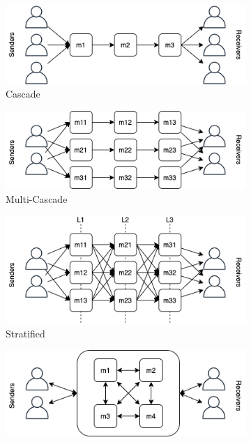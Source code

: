 \documentclass[logo,msc,cyber]{infthesis}   %
\begin{document}
\begin{figure}[h!]
    \centering
    \begin{subfigure}[b]{0.45\textwidth}
        \centering
        \includegraphics[width=\textwidth]{figures/topologies/cascade.png}
        \caption{Cascade}
        \label{fig:cascade}
    \end{subfigure}
    \hfill
    \begin{subfigure}[b]{0.45\textwidth}
        \centering
        \includegraphics[width=\textwidth]{figures/topologies/multi-cascade.png}
        \caption{Multi-Cascade}
        \label{fig:multi-cascade}
    \end{subfigure}
    \hfill
    \begin{subfigure}[b]{0.45\textwidth}
        \centering
        \includegraphics[width=\textwidth]{figures/topologies/stratified.png}
        \caption{Stratified}
        \label{fig:stratified}
    \end{subfigure}
    \hfill
    \begin{subfigure}[b]{0.45\textwidth}
        \centering
        \includegraphics[width=\textwidth]{figures/topologies/mesh.png}

\end{subfigure}
\end{figure}
\end{document}
